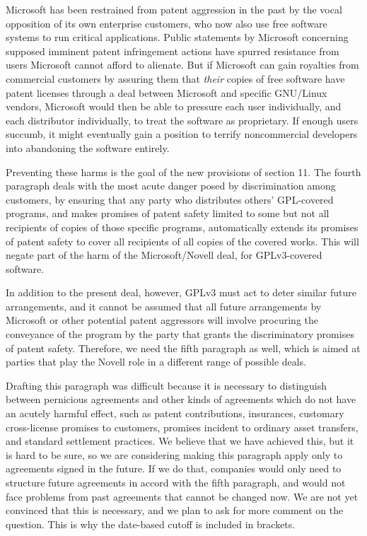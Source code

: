 Microsoft has been restrained from patent aggression in the past by the
vocal opposition of its own enterprise customers, who now also use free
software systems to run critical applications.  Public statements by
Microsoft concerning supposed imminent patent infringement actions have
spurred resistance from users Microsoft cannot afford to alienate.  But
if Microsoft can gain royalties from commercial customers by assuring
them that \textit{their} copies of free software have patent licenses
through a deal between Microsoft and specific GNU/Linux vendors,
Microsoft would then be able to pressure each user individually, and
each distributor individually, to treat the software as proprietary.  If
enough users succumb, it might eventually gain a position to terrify
noncommercial developers into abandoning the software entirely.

Preventing these harms is the goal of the new provisions of section 11.
The fourth paragraph deals with the most acute danger posed by
discrimination among customers, by ensuring that any party who
distributes others' GPL-covered programs, and makes promises of patent
safety limited to some but not all recipients of copies of those
specific programs, automatically extends its promises of patent safety
to cover all recipients of all copies of the covered works.  This will
negate part of the harm of the Microsoft/Novell deal, for GPLv3-covered
software.

In addition to the present deal, however, GPLv3 must act to deter
similar future arrangements, and it cannot be assumed that all future
arrangements by Microsoft or other potential patent aggressors will
involve procuring the conveyance of the program by the party that grants
the discriminatory promises of patent safety.  Therefore, we need the
fifth paragraph as well, which is aimed at parties that play the Novell
role in a different range of possible deals.

Drafting this paragraph was difficult because it is necessary to
distinguish between pernicious agreements and other kinds of agreements
which do not have an acutely harmful effect, such as patent
contributions, insurances, customary cross-license promises to
customers, promises incident to ordinary asset transfers, and standard
settlement practices.  We believe that we have achieved this, but it is
hard to be sure, so we are considering making this paragraph apply only
to agreements signed in the future.  If we do that, companies would only
need to structure future agreements in accord with the fifth paragraph,
and would not face problems from past agreements that cannot be changed
now.  We are not yet convinced that this is necessary, and we plan to
ask for more comment on the question. This is why the date-based cutoff
is included in brackets. 

